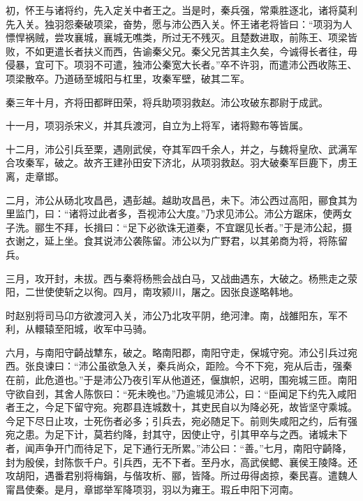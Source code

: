 \documentclass[12pt,UTF8]{ctexbook}
\begin{document}
初，怀王与诸将约，先入定关中者王之。当是时，秦兵强，常乘胜逐北，诸将莫利先入关。独羽怨秦破项梁，奋势，愿与沛公西入关。怀王诸老将皆曰：“项羽为人慓悍祸贼，尝攻襄城，襄城无噍类，所过无不残灭。且楚数进取，前陈王、项梁皆败，不如更遣长者扶义而西，告谕秦父兄。秦父兄苦其主久矣，今诚得长者往，毋侵暴，宜可下。项羽不可遣，独沛公秦宽大长者。”卒不许羽，而遣沛公西收陈王、项梁散卒。乃道砀至城阳与杠里，攻秦军壁，破其二军。



秦三年十月，齐将田都畔田荣，将兵助项羽救赵。沛公攻破东郡尉于成武。



十一月，项羽杀宋义，并其兵渡河，自立为上将军，诸将黥布等皆属。



十二月，沛公引兵至栗，遇刚武侯，夺其军四千余人，并之，与魏将皇欣、武满军合攻秦军，破之。故齐王建孙田安下济北，从项羽救赵。羽大破秦军巨鹿下，虏王离，走章邯。



二月，沛公从砀北攻昌邑，遇彭越。越助攻昌邑，未下。沛公西过高阳，郦食其为里监门，曰：“诸将过此者多，吾视沛公大度。”乃求见沛公。沛公方踞床，使两女子洗。郦生不拜，长揖曰：“足下必欲诛无道秦，不宜踞见长者。”于是沛公起，摄衣谢之，延上坐。食其说沛公袭陈留。沛公以为广野君，以其弟商为将，将陈留兵。



三月，攻开封，未拔。西与秦将杨熊会战白马，又战曲遇东，大破之。杨熊走之荥阳，二世使使斩之以徇。四月，南攻颍川，屠之。因张良遂略韩地。



时赵别将司马卬方欲渡河入关，沛公乃北攻平阴，绝河津。南，战雒阳东，军不利，从轘辕至阳城，收军中马骑。



六月，与南阳守齮战犨东，破之。略南阳郡，南阳守走，保城守宛。沛公引兵过宛西。张良谏曰：“沛公虽欲急入关，秦兵尚众，距险。今不下宛，宛从后击，强秦在前，此危道也。”于是沛公乃夜引军从他道还，偃旗帜，迟明，围宛城三匝。南阳守欲自刭，其舍人陈恢曰：“死未晚也。”乃逾城见沛公，曰：“臣闻足下约先入咸阳者王之，今足下留守宛。宛郡县连城数十，其吏民自以为降必死，故皆坚守乘城。今足下尽日止攻，士死伤者必多；引兵去，宛必随足下。前则失咸阳之约，后有强宛之患。为足下计，莫若约降，封其守，因使止守，引其甲卒与之西。诸城未下者，闻声争开门而待足下，足下通行无所累。”沛公曰：“善。”七月，南阳守齮降，封为殷侯，封陈恢千户。引兵西，无不下者。至丹水，高武侯鳃、襄侯王陵降。还攻胡阳，遇番君别将梅鋗，与偕攻析、郦，皆降。所过毋得卤掠，秦民喜。遣魏人甯昌使秦。是月，章邯举军降项羽，羽以为雍王。瑕丘申阳下河南。
\end{document}
